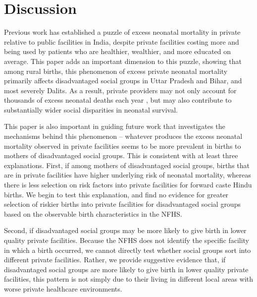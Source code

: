 \documentclass[12pt]{article}
\begin{document}
\section{Discussion}

Previous work has established a puzzle of excess neonatal mortality in private relative to public facilities in India, despite private facilities costing more and being used by patients who are healthier, wealthier, and more educated on average. This paper adds an important dimension to this puzzle, showing that among rural births, this phenomenon of excess private neonatal mortality primarily affects disadvantaged social groups in Uttar Pradesh and Bihar, and most severely Dalits. As a result, private providers may not only account for thousands of excess neonatal deaths each year \citep{franz2025cheaper}, but may also contribute to substantially wider social disparities in neonatal survival.

This paper is also important in guiding future work that investigates the mechanisms behind this phenomenon -- whatever produces the excess neonatal mortality observed in private facilities seems to be more prevalent in births to mothers of disadvantaged social groups. This is consistent with at least three explanations. First, if among mothers of disadvantaged social groups, births that are in private facilities have higher underlying risk of neonatal mortality, whereas there is less selection on risk factors into private facilities for forward caste Hindu births. We begin to test this explanation, and find no evidence for greater selection of riskier births into private facilities for disadvantaged social groups based on the observable birth characteristics in the NFHS.

Second, if disadvantaged social groups may be more likely to give birth in lower quality private facilities. Because the NFHS does not identify the specific facility in which a birth occurred, we cannot directly test whether social groups sort into different private facilities. Rather, we provide suggestive evidence that, if disadvantaged social groups are more likely to give birth in lower quality private facilities, this pattern is not simply due to their living in different local areas with worse private healthcare environments.
\end{document}
